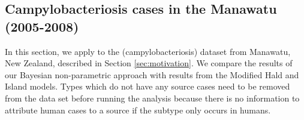 \subsection{Campylobacteriosis cases in the Manawatu (2005-2008)} \label{real_data_case_study_section}

In this section, we apply  to the  (campylobacteriosis) dataset from Manawatu, New Zealand, described in Section \ref{sec:motivation}.  We compare the results of our Bayesian non-parametric approach with results from the Modified Hald and Island models. Types which do not have any source cases need to be removed from the data set before running the analysis because there is no information to attribute human cases to a source if the subtype only occurs in humans.

\begin{knitrout}
\color{fgcolor}\begin{kframe}
\begin{alltt}
\hlstd{(}\hlstd{)}
 \hlkwb{<-} \hlstd{(}\hlstd{(campy[,}\hlstd{(} \hlopt{:} \hlstd{)],}  \hlopt{==} \hlstd{)}
 \hlkwb{<-} \hlstd{campy[}\hlopt{-}\hlstd{zero_rows,]}

 \hlkwb{<-} \hlstd{(} \hlstd{=} \hlstd{,}  \hlstd{=} \hlstd{,}  \hlstd{=} \hlstd{(}\hlstd{,} \hlstd{))}

\hlkwb{<-}\hlstd{(}\hlstd{,} \hlstd{,} \hlstd{,} \hlstd{,} \hlstd{,}  \hlopt{+} \hlstd{)}
\hlkwb{<-}\hlstd{(}\hlstd{,} \hlstd{,} \hlstd{,} \hlstd{,} \hlstd{,}  \hlopt{+} \hlstd{)}
 \hlkwb{<-} \hlstd{(}  \hlopt{/} 
                     \hlstd{=} \hlstd{(campy[,} \hlopt{:}\hlstd{]))}


\end{alltt}
\end{kframe}
\end{knitrout}
